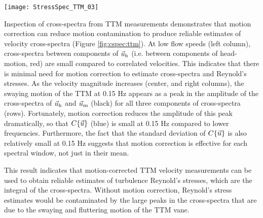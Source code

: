 \begin{figure*}[t]
  \centering
  \texttt{[image: StressSpec\_TTM\_03]}
  \caption{The real part of the cross-spectral density between velocity components measured by the TTM. The upper-row is the $u$-$v$ cross-spectral density, the middle-row is the $u$-$w$ cross-spectral density, and the bottom-row is the $v$-$w$ cross-spectral density.  The columns are for different ranges of the stream-wise mean velocity magnitude (indicated above the top row). The blue line is the cross-spectrum between components of motion-corrected velocity, the red line is the cross-spectrum between components of head-motion, and the black line is the cross-spectrum between components of uncorrected velocity. The light-blue shading indicates one standard deviation of the $C$ for the motion corrected cross-spectral density. N is the number of spectral ensembles in each column. The number in the lower right corner of each panel is the motion-corrected Reynold's stress (integral of the blue line) in units of 1e-4 $\mathrm{m^2s^{-2}}$.}
  \label{fig:cspec:ttm}
\end{figure*}

Inspection of cross-spectra from TTM measurements demonstrates that motion correction can reduce motion contamination to produce reliable estimates of velocity cross-spectra (Figure \ref{fig:cspec:ttm}). At low flow speeds (left column), cross-spectra between components of $\vec{u}_\mathrm{h}$ (i.e. between components of head-motion, red) are small compared to correlated velocities. This indicates that there is minimal need for motion correction to estimate cross-spectra and Reynold's stresses. As the velocity magnitude increases (center, and right columns), the swaying motion of the TTM at 0.15 Hz appears as a peak in the amplitude of the cross-spectra of $\vec{u}_\mathrm{h}$ and $\vec{u}_\mathrm{m}$ (black) for all three components of cross-spectra (rows). Fortunately, motion correction reduces the amplitude of this peak dramatically, so that $C\{\vec{u}\}$ (blue) is small at 0.15 Hz compared to lower frequencies. Furthermore, the fact that the standard deviation of $C\{\vec{u}\}$ is also relatively small at 0.15 Hz suggests that motion correction is effective for each spectral window, not just in their mean.

This result indicates that motion-corrected TTM velocity measurements can be used to obtain reliable estimates of turbulence Reynold's stresses, which are the integral of the cross-spectra. Without motion correction, Reynold's stress estimates would be contaminated by the large peaks in the cross-spectra that are due to the swaying and fluttering motion of the TTM vane.


